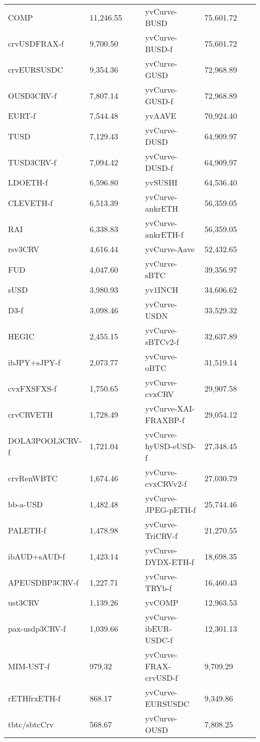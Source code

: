\begin{longtable}{@{}p{0.25\linewidth}p{0.25\linewidth}p{0.25\linewidth}p{0.25\linewidth}@{}}
COMP & 11,246.55 & yvCurve-BUSD & 75,601.72 \\
crvUSDFRAX-f & 9,700.50 & yvCurve-BUSD-f & 75,601.72 \\
crvEURSUSDC & 9,354.36 & yvCurve-GUSD & 72,968.89 \\
OUSD3CRV-f & 7,807.14 & yvCurve-GUSD-f & 72,968.89 \\
EURT-f & 7,544.48 & yvAAVE & 70,924.40 \\
TUSD & 7,129.43 & yvCurve-DUSD & 64,909.97 \\
TUSD3CRV-f & 7,094.42 & yvCurve-DUSD-f & 64,909.97 \\
LDOETH-f & 6,596.80 & yvSUSHI & 64,536.40 \\
CLEVETH-f & 6,513.39 & yvCurve-ankrETH & 56,359.05 \\
RAI & 6,338.83 & yvCurve-ankrETH-f & 56,359.05 \\
rsv3CRV & 4,616.44 & yvCurve-Aave & 52,432.65 \\
FUD & 4,047.60 & yvCurve-sBTC & 39,356.97 \\
sUSD & 3,980.93 & yv1INCH & 34,606.62 \\
D3-f & 3,098.46 & yvCurve-USDN & 33,529.32 \\
HEGIC & 2,455.15 & yvCurve-sBTCv2-f & 32,637.89 \\
ibJPY+sJPY-f & 2,073.77 & yvCurve-oBTC & 31,519.14 \\
cvxFXSFXS-f & 1,750.65 & yvCurve-cvxCRV & 29,907.58 \\
crvCRVETH & 1,728.49 & yvCurve-XAI-FRAXBP-f & 29,054.12 \\
DOLA3POOL3CRV-f & 1,721.04 & yvCurve-hyUSD-eUSD-f & 27,348.45 \\
crvRenWBTC & 1,674.46 & yvCurve-cvxCRVv2-f & 27,030.79 \\
bb-a-USD & 1,482.48 & yvCurve-JPEG-pETH-f & 25,744.46 \\
PALETH-f & 1,478.98 & yvCurve-TriCRV-f & 21,270.55 \\
ibAUD+sAUD-f & 1,423.14 & yvCurve-DYDX-ETH-f & 18,698.35 \\
APEUSDBP3CRV-f & 1,227.71 & yvCurve-TRYb-f & 16,460.43 \\
ust3CRV & 1,139.26 & yvCOMP & 12,963.53 \\
pax-usdp3CRV-f & 1,039.66 & yvCurve-ibEUR-USDC-f & 12,301.13 \\
MIM-UST-f & 979.32 & yvCurve-FRAX-crvUSD-f & 9,709.29 \\
rETHfrxETH-f & 868.17 & yvCurve-EURSUSDC & 9,349.86 \\
tbtc/sbtcCrv & 568.67 & yvCurve-OUSD & 7,808.25 \\

\end{longtable}
